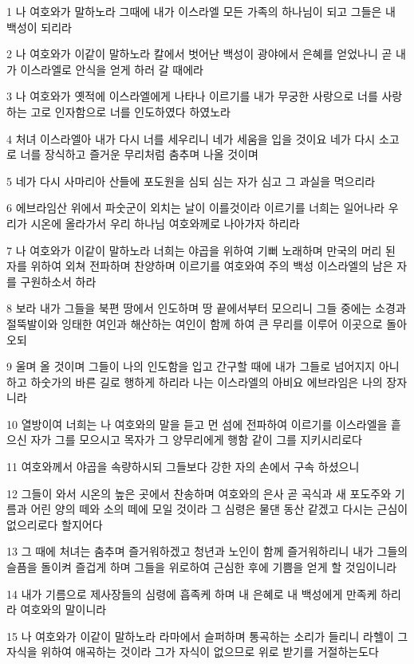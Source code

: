 \par 1 나 여호와가 말하노라 그때에 내가 이스라엘 모든 가족의 하나님이 되고 그들은 내 백성이 되리라
\par 2 나 여호와가 이같이 말하노라 칼에서 벗어난 백성이 광야에서 은혜를 얻었나니 곧 내가 이스라엘로 안식을 얻게 하러 갈 때에라
\par 3 나 여호와가 옛적에 이스라엘에게 나타나 이르기를 내가 무궁한 사랑으로 너를 사랑하는 고로 인자함으로 너를 인도하였다 하였노라
\par 4 처녀 이스라엘아 내가 다시 너를 세우리니 네가 세움을 입을 것이요 네가 다시 소고로 너를 장식하고 즐거운 무리처럼 춤추며 나올 것이며
\par 5 네가 다시 사마리아 산들에 포도원을 심되 심는 자가 심고 그 과실을 먹으리라
\par 6 에브라임산 위에서 파숫군이 외치는 날이 이를것이라 이르기를 너희는 일어나라 우리가 시온에 올라가서 우리 하나님 여호와께로 나아가자 하리라
\par 7 나 여호와가 이같이 말하노라 너희는 야곱을 위하여 기뻐 노래하며 만국의 머리 된 자를 위하여 외쳐 전파하며 찬양하며 이르기를 여호와여 주의 백성 이스라엘의 남은 자를 구원하소서 하라
\par 8 보라 내가 그들을 북편 땅에서 인도하며 땅 끝에서부터 모으리니 그들 중에는 소경과 절뚝발이와 잉태한 여인과 해산하는 여인이 함께 하여 큰 무리를 이루어 이곳으로 돌아오되
\par 9 울며 올 것이며 그들이 나의 인도함을 입고 간구할 때에 내가 그들로 넘어지지 아니하고 하숫가의 바른 길로 행하게 하리라 나는 이스라엘의 아비요 에브라임은 나의 장자니라
\par 10 열방이여 너희는 나 여호와의 말을 듣고 먼 섬에 전파하여 이르기를 이스라엘을 흩으신 자가 그를 모으시고 목자가 그 양무리에게 행함 같이 그를 지키시리로다
\par 11 여호와께서 야곱을 속량하시되 그들보다 강한 자의 손에서 구속 하셨으니
\par 12 그들이 와서 시온의 높은 곳에서 찬송하며 여호와의 은사 곧 곡식과 새 포도주와 기름과 어린 양의 떼와 소의 떼에 모일 것이라 그 심령은 물댄 동산 같겠고 다시는 근심이 없으리로다 할지어다
\par 13 그 때에 처녀는 춤추며 즐거워하겠고 청년과 노인이 함께 즐거워하리니 내가 그들의 슬픔을 돌이켜 즐겁게 하며 그들을 위로하여 근심한 후에 기쁨을 얻게 할 것임이니라
\par 14 내가 기름으로 제사장들의 심령에 흡족케 하며 내 은혜로 내 백성에게 만족케 하리라 여호와의 말이니라
\par 15 나 여호와가 이같이 말하노라 라마에서 슬퍼하며 통곡하는 소리가 들리니 라헬이 그 자식을 위하여 애곡하는 것이라 그가 자식이 없으므로 위로 받기를 거절하는도다
